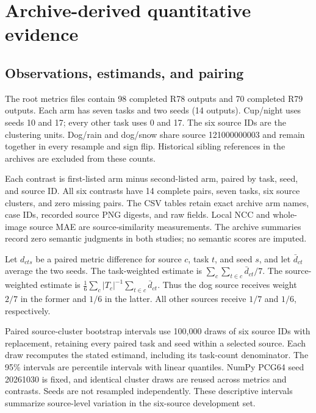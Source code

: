 

\section{Archive-derived quantitative evidence}\label{sec:evidence-appendix}

\subsection{Observations, estimands, and pairing}

The root metrics files contain 98 completed R78 outputs and 70 completed R79 outputs. Each arm has seven tasks and two seeds (14 outputs). Cup/night uses seeds 10 and 17; every other task uses 0 and 17. The six source IDs are the clustering units. Dog/rain and dog/snow share source 121000000003 and remain together in every resample and sign flip. Historical sibling references in the archives are excluded from these counts.

Each contrast is first-listed arm minus second-listed arm, paired by task, seed, and source ID. All six contrasts have 14 complete pairs, seven tasks, six source clusters, and zero missing pairs. The CSV tables retain exact archive arm names, case IDs, recorded source PNG digests, and raw fields. Local NCC and whole-image source MAE are source-similarity measurements. The archive summaries record zero semantic judgments in both studies; no semantic scores are imputed.

Let $d_{cts}$ be a paired metric difference for source $c$, task $t$, and seed $s$, and let $\bar d_{ct}$ average the two seeds. The task-weighted estimate is $\sum_c\sum_{t\in c}\bar d_{ct}/7$. The source-weighted estimate is $\frac16\sum_c |T_c|^{-1}\sum_{t\in c}\bar d_{ct}$. Thus the dog source receives weight $2/7$ in the former and $1/6$ in the latter. All other sources receive $1/7$ and $1/6$, respectively.

Paired source-cluster bootstrap intervals use 100,000 draws of six source IDs with replacement, retaining every paired task and seed within a selected source. Each draw recomputes the stated estimand, including its task-count denominator. The 95\% intervals are percentile intervals with linear quantiles. NumPy PCG64 seed 20261030 is fixed, and identical cluster draws are reused across metrics and contrasts. Seeds are not resampled independently. These descriptive intervals summarize source-level variation in the six-source development set.

